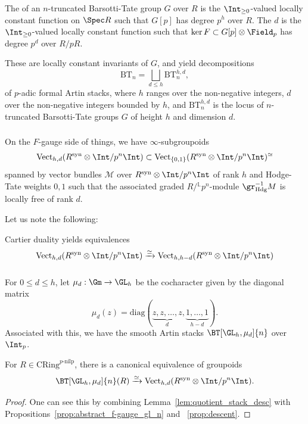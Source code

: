 \documentclass[10pt]{amsart}
\begin{document}
\subsubsection{}
The  of an $n$-truncated Barsotti-Tate group $G$ over $R$ is the $\Int_{\ge 0}$-valued locally constant function on $\Spec R$ such that $G[p]$ has degree $p^{h}$ over $R$. The  $d$ is the $\Int_{\ge 0}$-valued locally constant function such that $\ker F\subset G[p]\otimes\Field_p$ has degree $p^{d}$ over $R/pR$.

These are locally constant invariants of $G$, and yield decompositions
\[
\mathrm{BT}_n =\bigsqcup_{d\leq h}\mathrm{BT}^{h,d}_n,
\]
of $p$-adic formal Artin stacks, where $h$ ranges over the non-negative integers, $d$ over the non-negative integers bounded by $h$, and $\mathrm{BT}^{h,d}_n$ is the locus of $n$-truncated Barsotti-Tate groups $G$ of height $h$ and dimension $d$.

\subsubsection{}
On the $F$-gauge side of things, we have $\infty$-subgroupoids
\[
\mathrm{Vect}_{h,d}(R^{\mathrm{syn}}\otimes\Int/p^n\Int)\subset \mathrm{Vect}_{\{0,1\}}(R^{\mathrm{syn}}\otimes\Int/p^n\Int)^{\simeq}
\]
spanned by vector bundles $\mathcal{M}$ over $R^{\mathrm{syn}}\otimes\Int/p^n\Int$ of rank $h$  and Hodge-Tate weights $0,1$ such that the associated graded $R/{}^{\mathbb{L}}p^n$-module $\gr^{-1}_{\mathrm{Hdg}}M$ is locally free of rank $d$. 

Let us note the following:
\begin{lemma}
\label{lem:cartier_duality}
Cartier duality yields equivalences
\[
\mathrm{Vect}_{h,d}(R^{\mathrm{syn}}\otimes\Int/p^n\Int)\xrightarrow{\simeq}\mathrm{Vect}_{h,h-d}(R^{\mathrm{syn}}\otimes\Int/p^n\Int)
\]
\end{lemma}

 
\subsubsection{}
For $0\leq d\leq h$, let $\mu_d:\Gm\to \GL_h$ be the cocharacter given by the diagonal matrix
\[
\mu_d(z) = \mathrm{diag}(\underbrace{z,z,\ldots,z}_d,\underbrace{1,\ldots,1}_{h-d}).
\]
Associated with this, we have the smooth Artin stacks $\BT[\GL_h,\mu_d]{n}$ over $\Int_p$.

\begin{proposition}
\label{prop:vect_to_BT}
For $R\in \mathrm{CRing}^{p\text{-nilp}}$, there is a canonical equivalence of groupoids
\[
\BT[\GL_h,\mu_d]{n}(R)\xrightarrow{\simeq}\mathrm{Vect}_{h,d}(R^{\mathrm{syn}}\otimes\Int/p^n\Int).
\]
\end{proposition}
\begin{proof}
One can see this by combining Lemma~\ref{lem:quotient_stack_desc} with Propositions~\ref{prop:abstract_f-gauge_gl_n} and ~\ref{prop:descent}. 
\end{proof} 
\end{document}
